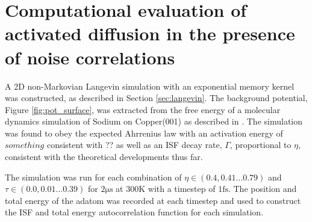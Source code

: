 \documentclass{article}
\newcommand{\fs}{\si{\femto\second}}
\newcommand{\us}{\si{\micro\second}}
\newcommand{\K}{\si{\kelvin}}
\begin{document}
\section{Computational evaluation of activated diffusion in the presence of noise correlations}

A 2D non-Markovian Langevin simulation with an exponential memory kernel was constructed, as described in Section \ref{sec:langevin}. The background potential, Figure \ref{fig:pot_surface}, was extracted from the free energy of a molecular dynamics simulation of Sodium on Copper(001) as described in \cite{Gil}. The simulation was found to obey the expected Ahrrenius law with an activation energy of $something$ consistent with ?? as well as an ISF decay rate, $\Gamma$, proportional to $\eta$, consistent with the theoretical developments thus far.

The simulation was run for each combination of $\eta \in \left(0.4, 0.41 \dots 0.79\right)$ and $\tau \in \left(0.0, 0.01 \dots 0.39\right)$ for $2\us$ at $300\K$ with a timestep of $1\fs$. The position and total energy of the adatom was recorded at each timestep and used to construct the ISF and total energy autocorrelation function for each simulation.
\end{document}
